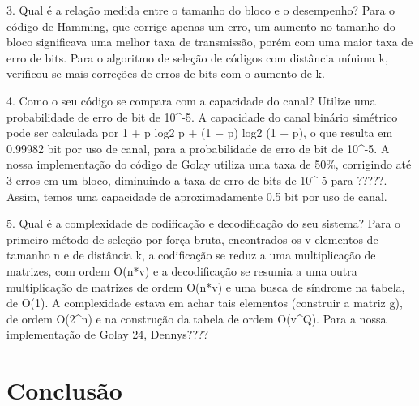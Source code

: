 \documentclass[%
aip,
jmp,%
amsmath,amssymb,
reprint,%
]{revtex4-1}
\begin{document}
	3. Qual é a relação medida entre o tamanho do bloco e o desempenho?
	Para o código de Hamming, que corrige apenas um erro, um aumento no tamanho do bloco significava uma melhor taxa de transmissão, porém com uma maior taxa de erro de bits.
	Para o algoritmo de seleção de códigos com distância mínima k, verificou-se mais correções de erros de bits com o aumento de k.
	
	4. Como o seu código se compara com a capacidade do canal? Utilize uma probabilidade de erro de bit de 10^-5.
	A capacidade do canal binário simétrico pode ser calculada por 1 + p log2 p  + (1 − p) log2 (1 − p), o que resulta em 0.99982 bit por uso de canal, para a probabilidade de erro de bit de 10^-5. A nossa implementação do código de Golay utiliza uma taxa de 50\%, corrigindo até 3 erros em um bloco, diminuindo a taxa de erro de bits de 10^-5 para ?????. Assim, temos uma capacidade de aproximadamente 0.5 bit por uso de canal.
	
	5. Qual é a complexidade de codificação e decodificação do seu sistema?
	Para o primeiro método de seleção por força bruta, encontrados os v elementos de tamanho n e de distância k, a codificação se reduz a uma multiplicação de matrizes, com ordem O(n*v) e a decodificação se resumia a uma outra multiplicação de matrizes de ordem O(n*v) e uma busca de síndrome na tabela, de O(1). A complexidade estava em achar tais elementos (construir a matriz g), de ordem O(2^n) e na construção da tabela de ordem O(v^Q).
	Para a nossa implementação de Golay 24, Dennys????
	
	
	\section{Conclus\~ao}
	
	
	
	
	
\flushleft
\flushleft

\pagebreak
\newpage
\newpage

\cleardoublepage
{}
{}


\end{document}
